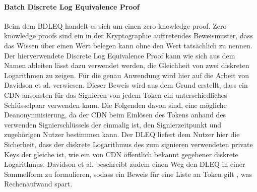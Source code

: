 \documentclass[11pt,a4paper]{scrreprt}
\begin{document}
\paragraph{Batch Discrete Log Equivalence Proof}
Beim dem BDLEQ handelt es sich um einen zero knowledge proof. Zero knowledge proofs sind ein in der Kryptographie auftretendes Beweismuster, dass das Wissen über einen Wert belegen kann ohne den Wert tatsächlich zu nennen. Der hierverwendete Discrete Log Equivalence Proof kann wie sich aus dem Namen ableiten lässt dazu verwendet werden, die Gleichheit von zwei diskreten Logarithmen zu zeigen. Für die genau Anwendung wird hier auf die Arbeit von Davidson et al. \cite{pp-davidson2018privacy} verwiesen. Dieser Beweis wird aus dem Grund erstellt, dass ein CDN ansonsten für das Signieren von jedem Token ein unterschiedliches Schlüsselpaar verwenden kann. Die Folgenden davon sind, eine mögliche Deanonynmisierung, da der CDN beim Einlösen des Tokens anhand des verwenden Signierschlüssels der einmalig ist, den Signierzeitpunkt und zugehörigen Nutzer bestimmen kann. Der DLEQ liefert dem Nutzer hier die Sicherheit, dass der diskrete Logarithmus des zum signieren verwendeten private Keys der gleiche ist, wie ein von CDN öffentlich bekannt gegebener diskrete Logarithmus. Davidson et al. beschreibt zudem einen Weg den DLEQ in einer Sammelform zu formulieren, sodass ein Beweis für eine Liste an Token gilt \cite{pp-davidson2018privacy}, was Rechenaufwand spart.\\\\
\end{document}
